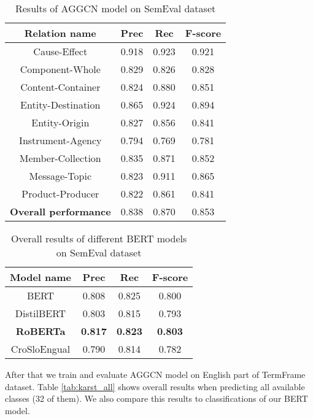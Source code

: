 \documentclass[fleqn,moreauthors,10pt]{ds_report}
\begin{document}
\begin{table}[h]
    \centering
    \begin{tabular}{|c|c|c|c|}
        \hline
        \textbf{Relation name} & \textbf{Prec} & \textbf{Rec} & \textbf{F-score} \\ \hline \hline
        Cause-Effect        &  0.918  &  0.923  &  0.921 \\ \hline
        Component-Whole     &  0.829  &  0.826  &  0.828 \\ \hline
        Content-Container   &  0.824  &  0.880  &  0.851 \\ \hline
        Entity-Destination  &  0.865  &  0.924  &  0.894 \\ \hline
        Entity-Origin       &  0.827  &  0.856  &  0.841 \\ \hline
        Instrument-Agency   &  0.794  &  0.769  &  0.781 \\ \hline
        Member-Collection   &  0.835  &  0.871  &  0.852 \\ \hline
        Message-Topic       &  0.823  &  0.911  &  0.865 \\ \hline
        Product-Producer    &  0.822  &  0.861  &  0.841 \\ \hline \hline
        \textbf{Overall performance} & 0.838 & 0.870 & 0.853 \\ \hline
    \end{tabular}
    \caption{Results of AGGCN model on SemEval dataset}
    \label{tab:semeval_aggcn}
\end{table}

\begin{table}[h]
    \centering
    \begin{tabular}{|c|c|c|c|}
        \hline
        \textbf{Model name} & \textbf{Prec} & \textbf{Rec} & \textbf{F-score} \\ \hline \hline
        BERT        &  0.808  &  0.825  &  0.800 \\ \hline
        DistilBERT     &  0.803  &  0.815  &  0.793 \\ \hline
        \textbf{RoBERTa}   &  \textbf{0.817}  & \textbf{0.823}  &  \textbf{0.803} \\ \hline
        CroSloEngual   &  0.790  &  0.814  &  0.782 \\ \hline
    \end{tabular}
    \caption{Overall results of different BERT models on SemEval dataset}
    \label{tab:semeval_bert}
\end{table}

\par After that we train and evaluate AGGCN model on English part of TermFrame dataset. Table \ref{tab:karst_all} shows overall results when predicting all available classes (32 of them). We also compare this results to classifications of our BERT model.
\end{document}
